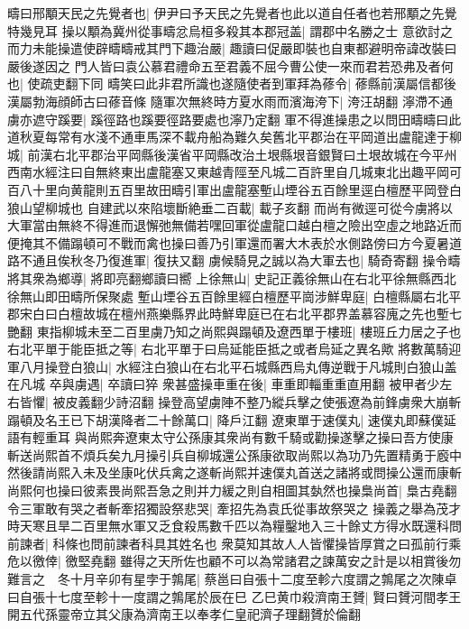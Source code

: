 疇曰邢顒天民之先覺者也|{
	伊尹曰予天民之先覺者也此以道自任者也若邢顒之先覺特幾見耳}
操以顒為冀州從事疇忿烏桓多殺其本郡冠盖|{
	謂郡中名勝之士}
意欲討之而力未能操遣使辟疇疇戒其門下趣治嚴|{
	趣讀曰促嚴即裝也自東都避明帝諱改裝曰嚴後遂因之}
門人皆曰袁公慕君禮命五至君義不屈今曹公使一來而君若恐弗及者何也|{
	使疏吏翻下同}
疇笑曰此非君所識也遂隨使者到軍拜為蓚令|{
	蓚縣前漢屬信都後漢屬勃海顔師古曰蓚音條}
隨軍次無終時方夏水雨而濱海洿下|{
	洿汪胡翻}
濘滯不通虜亦遮守蹊要|{
	蹊徑路也蹊要徑路要處也濘乃定翻}
軍不得進操患之以問田疇疇曰此道秋夏每常有水淺不通車馬深不載舟船為難久矣舊北平郡治在平岡道出盧龍達于柳城|{
	前漢右北平郡治平岡縣後漢省平岡縣改治土垠縣垠音銀賢曰土垠故城在今平州西南水經注曰自無終東出盧龍塞又東越青陘至凡城二百許里自几城東北出趣平岡可百八十里向黄龍則五百里故田疇引軍出盧龍塞塹山堙谷五百餘里逕白檀歷平岡登白狼山望柳城也}
自建武以來陷壞斷絶垂二百載|{
	載子亥翻}
而尚有微逕可從今虜將以大軍當由無終不得進而退懈弛無備若嘿回軍從盧龍口越白檀之險出空虛之地路近而便掩其不備蹋頓可不戰而禽也操曰善乃引軍還而署大木表於水側路傍曰方今夏暑道路不通且俟秋冬乃復進軍|{
	復扶又翻}
虜候騎見之誠以為大軍去也|{
	騎奇寄翻}
操令疇將其衆為鄉導|{
	將即亮翻鄉讀曰嚮}
上徐無山|{
	史記正義徐無山在右北平徐無縣西北徐無山即田疇所保聚處}
塹山堙谷五百餘里經白檀歷平崗涉鮮卑庭|{
	白檀縣屬右北平郡宋白曰白檀故城在檀州燕樂縣界此時鮮卑庭已在右北平郡界盖慕容廆之先也塹七艷翻}
東指柳城未至二百里虜乃知之尚熙與蹋頓及遼西單于樓班|{
	樓班丘力居之子也}
右北平單于能臣抵之等|{
	右北平單于曰烏延能臣抵之或者烏延之異名歟}
將數萬騎迎軍八月操登白狼山|{
	水經注白狼山在右北平石城縣西烏丸傳逆戰于凡城則白狼山盖在凡城}
卒與虜遇|{
	卒讀曰猝}
衆甚盛操車重在後|{
	車重即輜重重直用翻}
被甲者少左右皆懼|{
	被皮義翻少詩沼翻}
操登高望虜陣不整乃縱兵擊之使張遼為前鋒虜衆大崩斬蹋頓及名王已下胡漢降者二十餘萬口|{
	降戶江翻}
遼東單于速僕丸|{
	速僕丸即蘇僕延語有輕重耳}
與尚熙奔遼東太守公孫康其衆尚有數千騎或勸操遂擊之操曰吾方使康斬送尚熙首不煩兵矣九月操引兵自柳城還公孫康欲取尚熙以為功乃先置精勇于廏中然後請尚熙入未及坐康叱伏兵禽之遂斬尚熙并速僕丸首送之諸將或問操公還而康斬尚熙何也操曰彼素畏尚熙吾急之則并力緩之則自相圖其埶然也操梟尚首|{
	梟古堯翻}
令三軍敢有哭之者斬牽招獨設祭悲哭|{
	牽招先為袁氏從事故祭哭之}
操義之舉為茂才時天寒且旱二百里無水軍又乏食殺馬數千匹以為糧鑿地入三十餘丈方得水既還科問前諫者|{
	科條也問前諫者科具其姓名也}
衆莫知其故人人皆懼操皆厚賞之曰孤前行乘危以徼倖|{
	徼堅堯翻}
雖得之天所佐也顧不可以為常諸君之諫萬安之計是以相賞後勿難言之　冬十月辛卯有星孛于鶉尾|{
	蔡邕曰自張十二度至軫六度謂之鶉尾之次陳卓曰自張十七度至軫十一度謂之鶉尾於辰在巳}
乙巳黄巾殺濟南王贇|{
	賢曰贇河間孝王開五代孫靈帝立其父康為濟南王以奉孝仁皇祀濟子理翻贇於倫翻}
